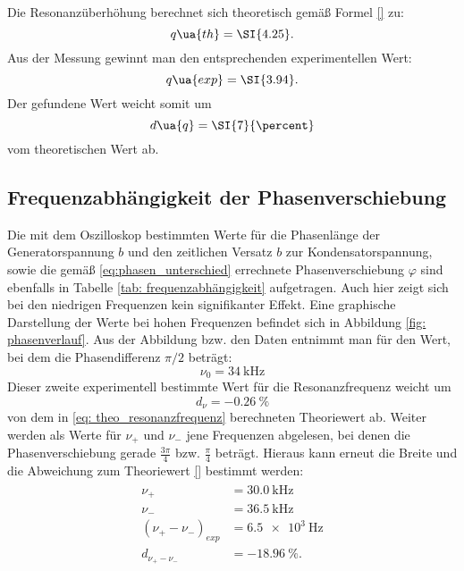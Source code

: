 Die Resonanzüberhöhung berechnet sich theoretisch gemäß Formel \eqref{} zu:
\begin{equation}
  q\ua{th} = \SI{4.25}.
\end{equation}
Aus der Messung gewinnt man den entsprechenden experimentellen Wert:
\begin{equation}
    q\ua{exp} = \SI{3.94}.
\end{equation}
Der gefundene Wert weicht somit um
\begin{equation}
  d\ua{q} = \SI{7}{\percent}
\end{equation}
vom theoretischen Wert ab.

\subsection{Frequenzabhängigkeit der Phasenverschiebung}
Die mit dem Oszilloskop bestimmten Werte für die Phasenlänge der Generatorspannung $b$ und den zeitlichen Versatz $b$ zur Kondensatorspannung, sowie die gemäß \eqref{eq:phasen_unterschied}
errechnete Phasenverschiebung $\varphi$ sind ebenfalls in Tabelle \ref{tab: frequenzabhängigkeit} aufgetragen. Auch hier zeigt sich bei den niedrigen
Frequenzen kein signifikanter Effekt. Eine graphische Darstellung der Werte bei hohen Frequenzen befindet sich in
Abbildung \ref{fig: phasenverlauf}. Aus der Abbildung bzw. den Daten entnimmt man für den Wert, bei dem die Phasendifferenz $\pi/2$ beträgt:
\begin{equation}
  \nu_0 = \SI{34}{\kilo\hertz}
\end{equation}
Dieser zweite experimentell bestimmte Wert für die Resonanzfrequenz weicht um
\begin{equation}
  d_{\nu} = \SI{-0.26}{\percent}
\end{equation}
von dem in \eqref{eq: theo_resonanzfrequenz} berechneten Theoriewert ab.
Weiter werden als Werte für $\nu_+$ und $\nu_-$ jene Frequenzen abgelesen, bei denen die Phasenverschiebung
gerade $\frac{3\pi}{4}$ bzw. $\frac{\pi}{4}$ beträgt. Hieraus kann erneut die Breite und die Abweichung
zum Theoriewert \eqref{} bestimmt werden:
\begin{align}
  \begin{aligned}
  \nu_{+} &= \SI{30.0}{\kilo\hertz} \\
  \nu_{-} &= \SI{36.5}{\kilo\hertz} \\
  (\nu_{+}-\nu_{-})_{exp} &= \SI{6.5e3}{\hertz} \\
  d_{\nu_{+}-\nu_{-}} &= \SI{-18.96}{\percent}.
\end{aligned}
\end{align}


